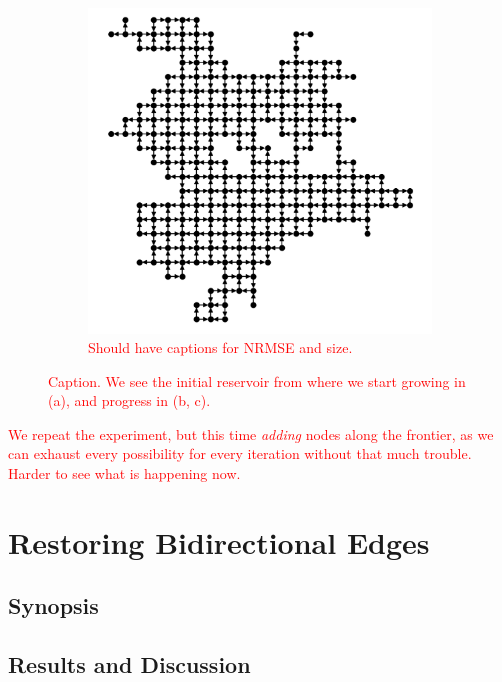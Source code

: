 \begin{figure}[t]
\begin{subfigure}{.49\textwidth}
    \includegraphics[width=1.0\linewidth]{figures/sq-grid-grow-250.png}
    \caption{\textcolor{red}{Should have captions for NRMSE and size.}}
    \label{fig:sq-grid-grow-250}
  \end{subfigure}
  \caption{
    \textcolor{red}{
      Caption. We see the initial reservoir from where we start growing in (a),
and progress in (b, c).
    }
  }
  \label{fig:sq-grid-grow}
\end{figure}

\textcolor{red}{
  We repeat the experiment, but this time \textit{adding} nodes along the
frontier, as we can exhaust every possibility for every iteration without that
much trouble. Harder to see what is happening now.
}

\section{Restoring Bidirectional Edges}

\subsection{Synopsis}

\subsection{Results and Discussion}

